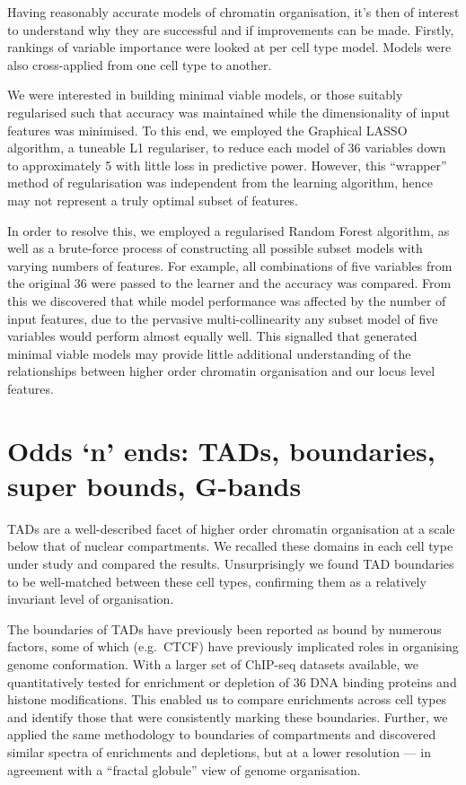 \documentclass[a4paper,10pt,oneside]{book}
\begin{document}
Having reasonably accurate models of chromatin organisation, it's then
of interest to understand why they are successful and if improvements
can be made. Firstly, rankings of variable importance were looked at per
cell type model. Models were also cross-applied from one cell type to
another.

We were interested in building minimal viable models, or those suitably
regularised such that accuracy was maintained while the dimensionality
of input features was minimised. To this end, we employed the Graphical
LASSO algorithm, a tuneable L1 regulariser, to reduce each model of 36
variables down to approximately 5 with little loss in predictive power.
However, this ``wrapper'' method of regularisation was independent from
the learning algorithm, hence may not represent a truly optimal subset
of features.

In order to resolve this, we employed a regularised Random Forest
algorithm\cite{deng2012, Touw2013a}, as well as a brute-force process of
constructing all possible subset models with varying numbers of
features. For example, all combinations of five variables from the
original 36 were passed to the learner and the accuracy was compared.
From this we discovered that while model performance was affected by the
number of input features, due to the pervasive multi-collinearity any
subset model of five variables would perform almost equally well. This
signalled that generated minimal viable models may provide little
additional understanding of the relationships between higher order
chromatin organisation and our locus level features.

\section{\textbf{Odds `n' ends}: TADs, boundaries, super bounds,
G-bands}\label{odds-n-ends-tads-boundaries-super-bounds-g-bands}

TADs are a well-described facet of higher order chromatin organisation
at a scale below that of nuclear compartments. We recalled these domains
in each cell type under study and compared the results. Unsurprisingly
we found TAD boundaries to be well-matched between these cell types,
confirming them as a relatively invariant level of organisation.

The boundaries of TADs have previously been reported as bound by
numerous factors, some of which (e.g.~CTCF\citep{Ong2014}) have
previously implicated roles in organising genome conformation. With a
larger set of ChIP-seq datasets available, we quantitatively tested for
enrichment or depletion of 36 DNA binding proteins and histone
modifications. This enabled us to compare enrichments across cell types
and identify those that were consistently marking these boundaries.
Further, we applied the same methodology to boundaries of compartments
and discovered similar spectra of enrichments and depletions, but at a
lower resolution --- in agreement with a ``fractal globule'' view of
genome organisation.
\end{document}
